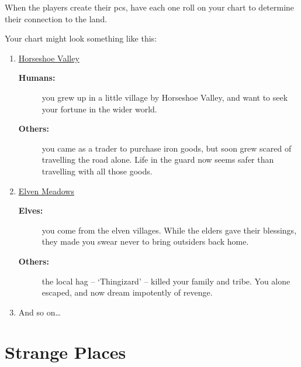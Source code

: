\begin{multicols}{2}
When the players create their \glspl{pc}, have each one roll on your chart to determine their connection to the land.

\needspace{8em}
Your chart might look something like this:
\begin{enumerate}
  \item
  \underline{Horseshoe Valley}
  \begin{description}
    \item[\textbf{Humans:}] you grew up in a little \gls{village} by Horseshoe Valley, and want to seek your fortune in the wider world.
    \item[\textbf{Others:}] you came as a trader to purchase iron goods, but soon grew scared of travelling the road alone.
    Life in the \gls{guard} now seems safer than travelling with all those goods.
  \end{description}
  \item
  \underline{Elven Meadows}
  \begin{description}
    \item[\textbf{Elves:}]
    you come from the elven villages.
    While the elders gave their blessings, they made you swear never to bring outsiders back home.
    \item[\textbf{Others:}]
    the local hag -- `Thingizard' -- killed your family and tribe.
    You alone escaped, and now dream impotently of revenge.
  \end{description}
  \item
  And so on\ldots
\end{enumerate}

\end{multicols}

\section{Strange Places}

